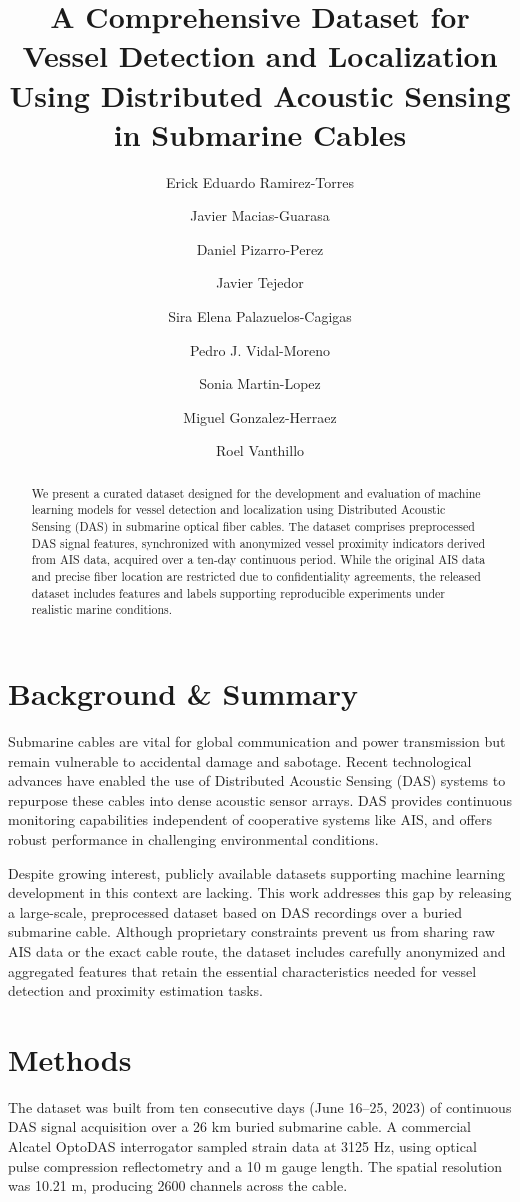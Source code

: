 \documentclass[11pt]{article}
\title{A Comprehensive Dataset for Vessel Detection and Localization Using Distributed Acoustic Sensing in Submarine Cables}
\author[1]{Erick Eduardo Ramirez-Torres}
\author[1]{Javier Macias-Guarasa}
\author[1]{Daniel Pizarro-Perez}
\author[2]{Javier Tejedor}
\author[1]{Sira Elena Palazuelos-Cagigas}
\author[1]{Pedro J. Vidal-Moreno}
\author[1]{Sonia Martin-Lopez}
\author[1]{Miguel Gonzalez-Herraez}
\author[3]{Roel Vanthillo}
\affil[1]{Departamento de Electr\'onica, Universidad de Alcal\'a, Alcal\'a de Henares, Spain}
\affil[2]{Universidad San Pablo-CEU, Boadilla del Monte, Spain}
\affil[3]{Marlinks, Leuven, Belgium}
\date{}
\begin{document}
\maketitle

\begin{abstract}
We present a curated dataset designed for the development and evaluation of machine learning models for vessel detection and localization using Distributed Acoustic Sensing (DAS) in submarine optical fiber cables. The dataset comprises preprocessed DAS signal features, synchronized with anonymized vessel proximity indicators derived from AIS data, acquired over a ten-day continuous period. While the original AIS data and precise fiber location are restricted due to confidentiality agreements, the released dataset includes features and labels supporting reproducible experiments under realistic marine conditions.
\end{abstract}

\section*{Background \& Summary}
Submarine cables are vital for global communication and power transmission but remain vulnerable to accidental damage and sabotage. Recent technological advances have enabled the use of Distributed Acoustic Sensing (DAS) systems to repurpose these cables into dense acoustic sensor arrays. DAS provides continuous monitoring capabilities independent of cooperative systems like AIS, and offers robust performance in challenging environmental conditions.

Despite growing interest, publicly available datasets supporting machine learning development in this context are lacking. This work addresses this gap by releasing a large-scale, preprocessed dataset based on DAS recordings over a buried submarine cable. Although proprietary constraints prevent us from sharing raw AIS data or the exact cable route, the dataset includes carefully anonymized and aggregated features that retain the essential characteristics needed for vessel detection and proximity estimation tasks.

\section*{Methods}
The dataset was built from ten consecutive days (June 16–25, 2023) of continuous DAS signal acquisition over a 26 km buried submarine cable. A commercial Alcatel OptoDAS interrogator sampled strain data at 3125 Hz, using optical pulse compression reflectometry and a 10 m gauge length. The spatial resolution was 10.21 m, producing 2600 channels across the cable.
\end{document}
